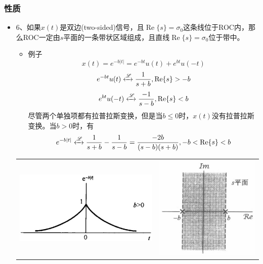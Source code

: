\documentclass[CJKutf8,dvipsnames,table]{beamer}
\begin{document}
\begin{CJK*}{UTF8}{song}
  \begin{frame}
    \frametitle{性质}
    \begin{itemize}
    \item 6、如果$x(t)$是双边(two-sided)信号，且$\operatorname{Re}\{s\}=\sigma_0$这条线位于ROC内，那么ROC一定由$s$平面的一条带状区域组成，且直线$\operatorname{Re}\{s\}=\sigma_0$位于带中。   
    \begin{itemize}
    \item 例子
    \[
    	x(t) = e^{-b|t|}=e^{-bt}u(t)+e^{bt}u(-t)
    \]
    \[
    	e^{-bt}u(t) \xleftrightarrow{\mathscr{L}} \frac{1}{s+b}, \operatorname{Re}\{s\} > -b
    \]
    \[
    	e^{bt}u(-t) \xleftrightarrow{\mathscr{L}} \frac{-1}{s-b}, \operatorname{Re}\{s\} < b
    \]
    尽管两个单独项都有拉普拉斯变换，但是当$b \leq 0$时，$x(t)$没有拉普拉斯变换。当$b>0$时，有
    \[
    	e^{-b|t|} \xleftrightarrow{\mathscr{L}} \frac{1}{s+b} - \frac{1}{s-b}=\frac{-2b}{(s-b)(s+b)}, -b < \operatorname{Re}\{s\} < b
    \]
    
    \end{itemize}
		\begin{center}
		\begin{tabular}{ll}
		\includegraphics[scale=.2]{ss-c-f9-11a}
		&
     	\includegraphics[scale=.2]{ss-c-f9-12}
    	\end{tabular} 
		\end{center}
    \end{itemize}
  \end{frame}      
         

\end{CJK*}
\end{document}

